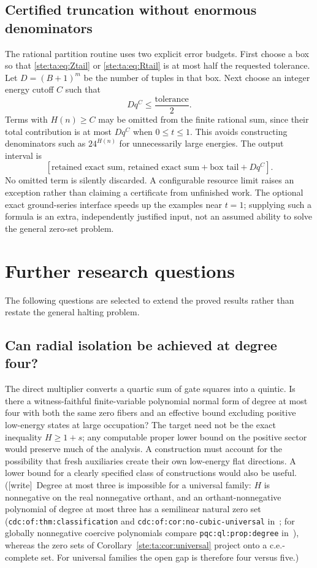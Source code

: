 \documentclass[11pt,letterpaper]{article}
\theoremstyle{definition}
\theoremstyle{remark}
\newcommand{\wtag}{\textup{[write]}}
\begin{document}
\subsection{Certified truncation without enormous denominators}
The rational partition routine uses two explicit error budgets. First choose a box so that \eqref{ste:ta:eq:Ztail} or \eqref{ste:ta:eq:Rtail} is at most half the requested tolerance. Let $D=(B+1)^m$ be the number of tuples in that box. Next choose an integer energy cutoff $C$ such that
\[
Dq^C\le\frac{\text{tolerance}}{2}.
\]
Terms with $H(n)\ge C$ may be omitted from the finite rational sum, since their total contribution is at most $Dq^C$ when $0\le t\le1$. This avoids constructing denominators such as $24^{H(n)}$ for unnecessarily large energies. The output interval is
\[
[\text{retained exact sum},\,
 \text{retained exact sum}+\text{box tail}+Dq^C].
\]
No omitted term is silently discarded. A configurable resource limit raises an exception rather than claiming a certificate from unfinished work. The optional exact ground-series interface speeds up the examples near $t=1$; supplying such a formula is an extra, independently justified input, not an assumed ability to solve the general zero-set problem.

\section{Further research questions}\label{ste:ta:sec:questions}
The following questions are selected to extend the proved results rather than restate the general halting problem.

\subsection{Can radial isolation be achieved at degree four?}\label{ste:ta:q:degree4}
The direct multiplier converts a quartic sum of gate squares into a quintic. Is there a witness-faithful finite-variable polynomial normal form of degree at most four with both the same zero fibers and an effective bound excluding positive low-energy states at large occupation? The target need not be the exact inequality $H\ge1+s$; any computable proper lower bound on the positive sector would preserve much of the analysis. A construction must account for the possibility that fresh auxiliaries create their own low-energy flat directions. A lower bound for a clearly specified class of constructions would also be useful.
(\wtag\ Degree at most three is impossible for a universal family: $H$ is nonnegative on the real nonnegative orthant, and an orthant-nonnegative polynomial of degree at most three has a semilinear natural zero set (\texttt{cdc:of:thm:classification} and \texttt{cdc:of:cor:no-cubic-universal} in~\cite{cdc}; for globally nonnegative coercive polynomials compare \texttt{pqc:ql:prop:degree} in~\cite{pqc}), whereas the zero sets of Corollary~\ref{ste:ta:cor:universal} project onto a c.e.-complete set. For universal families the open gap is therefore four versus five.)
\end{document}
